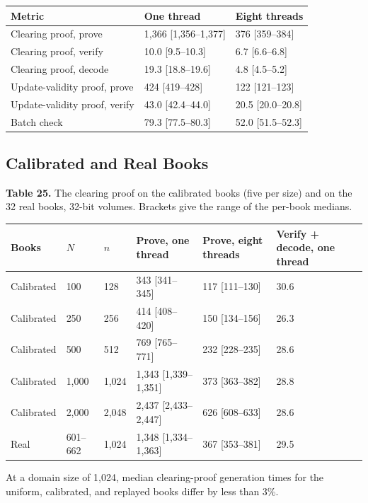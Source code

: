\begin{longtable}[]{@{}lll@{}}
\toprule\noalign{}
Metric & One thread & Eight threads \\
\midrule\noalign{}
\endhead
\bottomrule\noalign{}
\endlastfoot
Clearing proof, prove & 1,366 [1,356--1,377] & 376 [359--384] \\
Clearing proof, verify & 10.0 [9.5--10.3] & 6.7 [6.6--6.8] \\
Clearing proof, decode & 19.3 [18.8--19.6] & 4.8 [4.5--5.2] \\
Update-validity proof, prove & 424 [419--428] & 122 [121--123] \\
Update-validity proof, verify & 43.0 [42.4--44.0] & 20.5 [20.0--20.8] \\
Batch check & 79.3 [77.5--80.3] & 52.0 [51.5--52.3] \\
\end{longtable}

\subsection{Calibrated and Real Books}

\textbf{Table 25.} The clearing proof on the calibrated books (five per size) and on the 32 real books, 32-bit volumes. Brackets give the range of the per-book medians.

\begin{longtable}[]{@{}llllll@{}}
\toprule\noalign{}
Books & \(N\) & \(n\) & Prove, one thread & Prove, eight threads & Verify + decode, one thread \\
\midrule\noalign{}
\endhead
\bottomrule\noalign{}
\endlastfoot
Calibrated & 100 & 128 & 343 [341--345] & 117 [111--130] & 30.6 \\
Calibrated & 250 & 256 & 414 [408--420] & 150 [134--156] & 26.3 \\
Calibrated & 500 & 512 & 769 [765--771] & 232 [228--235] & 28.6 \\
Calibrated & 1,000 & 1,024 & 1,343 [1,339--1,351] & 373 [363--382] & 28.8 \\
Calibrated & 2,000 & 2,048 & 2,437 [2,433--2,447] & 626 [608--633] & 28.6 \\
Real & 601--662 & 1,024 & 1,348 [1,334--1,363] & 367 [353--381] & 29.5 \\
\end{longtable}

At a domain size of 1,024, median clearing-proof generation times for the uniform, calibrated, and replayed books differ by less than 3\%.

